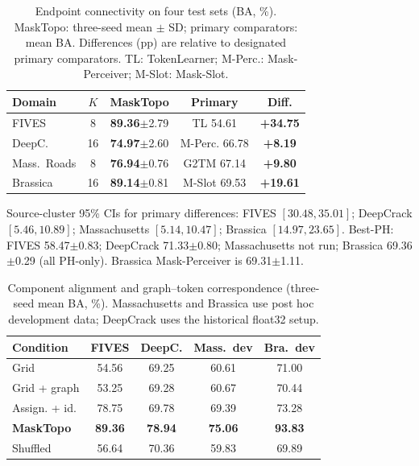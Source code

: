 
\begin{table}[t]
\centering
\caption{Endpoint connectivity on four test sets (BA, \%). MaskTopo: three-seed mean $\pm$ SD; primary comparators: mean BA. Differences (pp) are relative to designated primary comparators. TL: TokenLearner; M-Perc.: Mask-Perceiver; M-Slot: Mask-Slot.}
\label{tab:main}
\setlength{\tabcolsep}{1.5pt}
\small
\begin{tabular}{@{}lcccc@{}}
\toprule
Domain & $K$ & MaskTopo & Primary & Diff. \\
\midrule
FIVES & 8 & \textbf{89.36}$\pm$2.79 & TL 54.61 & \textbf{+34.75} \\
DeepC. & 16 & \textbf{74.97}$\pm$2.60 & M-Perc. 66.78 & \textbf{+8.19} \\
Mass.\ Roads & 8 & \textbf{76.94}$\pm$0.76 & G2TM 67.14 & \textbf{+9.80} \\
Brassica & 16 & \textbf{89.14}$\pm$0.81 & M-Slot 69.53 & \textbf{+19.61} \\
\bottomrule
\end{tabular}

\raggedright\small
Source-cluster 95\% CIs for primary differences: FIVES $[30.48,35.01]$;
DeepCrack $[5.46,10.89]$; Massachusetts $[5.14,10.47]$;
Brassica $[14.97,23.65]$.
Best-PH: FIVES 58.47$\pm$0.83; DeepCrack 71.33$\pm$0.80;
Massachusetts not run; Brassica 69.36$\pm$0.29 (all PH-only).
Brassica Mask-Perceiver is 69.31$\pm$1.11.
\end{table}

\begin{table}[t]
\centering
\caption{Component alignment and graph--token correspondence (three-seed mean BA, \%). Massachusetts and Brassica use post hoc development data; DeepCrack uses the historical float32 setup.}
\label{tab:mech}
\setlength{\tabcolsep}{1.5pt}
\small
\begin{tabular}{@{}lcccc@{}}
\toprule
Condition & FIVES & DeepC. & Mass.\ dev & Bra.\ dev \\
\midrule
Grid & 54.56 & 69.25 & 60.61 & 71.00 \\
Grid + graph & 53.25 & 69.28 & 60.67 & 70.44 \\
Assign. + id. & 78.75 & 69.78 & 69.39 & 73.28 \\
\textbf{MaskTopo} & \textbf{89.36} & \textbf{78.94} & \textbf{75.06} & \textbf{93.83} \\
Shuffled & 56.64 & 70.36 & 59.83 & 69.89 \\
\bottomrule
\end{tabular}

\end{table}

